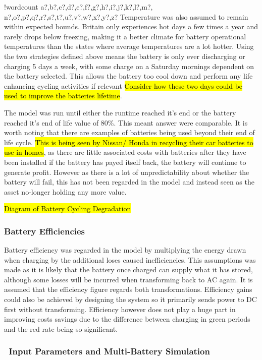 \documentclass[fontsize=9.5pt]{extarticle}
\numberwithin{figure}{section} %
\newcounter{words}
\newenvironment{counted}{%
  \setcounter{words}{0}
  \SearchList!{wordcount}{\stepcounter{words}}
    {a?,b?,c?,d?,e?,f?,g?,h?,i?,j?,k?,l?,m?,
    n?,o?,p?,q?,r?,s?,t?,u?,v?,w?,x?,y?,z?}
  \UndoBoundary{'}
  \SearchOrder{p;}}{%
  \StopSearching}
\begin{document}
\begin{counted}
Temperature was also assumed to remain within expected bounds. Britain
only experiences hot days a few times a year and rarely drops below
freezing, making it a better climate for battery operational
temperatures than the states where average temperatures are a lot
hotter. Using the two strategies defined above means the battery is only
ever discharging or charging 5 days a week, with some charge on a
Saturday mornings dependent on the battery selected. This allows the
battery too cool down and perform any life enhancing cycling activities
if relevant
\hl{Consider how these two days could be used to improve the batteries lifetime}.

The model was run until either the runtime reached it's end or the
battery reached it's end of life value of 80\%. This meant answer were
comparable. It is worth noting that there are examples of batteries
being used beyond their end of life cycle.
\hl{This is being seen by Nissan/ Honda in recycling their car batteries to use in homes},
as there are little associated costs with batteries after they have been
installed if the battery has payed itself back, the battery will
continue to generate profit. However as there is a lot of
unpredictability about whether the battery will fail, this has not been
regarded in the model and instead seen as the asset no-longer holding
any more value.

\hl{Diagram of Battery Cycling Degradation}

\subsubsection{Battery Efficiencies}\label{battery-efficiencies}

Battery efficiency was regarded in the model by multiplying the energy
drawn when charging by the additional loses caused inefficiencies. This
assumptions was made as it is likely that the battery once charged can
supply what it has stored, although some losses will be incurred when
transforming back to AC again. It is assumed that the efficiency figure
regards both transformations. Efficiency gains could also be achieved by
designing the system so it primarily sends power to DC first without
transforming. Efficiency however does not play a huge part in improving
costs savings due to the difference between charging in green periods
and the red rate being so significant.

\subsubsection{~Input Parameters and Multi-Battery
Simulation}\label{input-parameters-and-multi-battery-simulation}


\end{counted}
\end{document}
